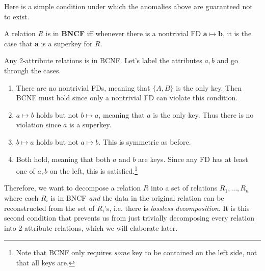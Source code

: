 \documentclass{article}
\begin{document}
    Here is a simple condition under which the anomalies above are guaranteed not to exist. 

    \begin{definition}[BNCF]
      A relation $R$ is in \textbf{BNCF} iff whenever there is a nontrivial FD $\mathbf{a} \mapsto \mathbf{b}$, it is the case that $\mathbf{a}$ is a superkey for $R$. 
    \end{definition}

    \begin{example}
      
    \end{example}

    \begin{example}
      
    \end{example}

    \begin{theorem}
      Any 2-attribute relations is in BCNF. Let's label the attributes $a, b$ and go through the cases. 
      \begin{enumerate}
        \item There are no nontrivial FDs, meaning that $\{A, B\}$ is the only key. Then BCNF must hold since only a nontrivial FD can violate this condition. 
        \item $a \mapsto b$ holds but not $b \mapsto a$, meaning that $a$ is the only key. Thus there is no violation since $a$ is a superkey. 
        \item $b \mapsto a$ holds but not $a \mapsto b$. This is symmetric as before. 
        \item Both hold, meaning that both $a$ and $b$ are keys. Since any FD has at least one of $a, b$ on the left, this is satisfied.\footnote{Note that BCNF only requires \textit{some} key to be contained on the left side, not that all keys are. } 
      \end{enumerate}
    \end{theorem}

    Therefore, we want to decompose a relation $R$ into a set of relations $R_1, \ldots, R_n$ where each $R_i$ is in BNCF \textit{and} the data in the original relation can be reconstructed from the set of $R_i$'s, i.e. there is \textit{lossless decomposition}. It is this second condition that prevents us from just trivially decomposing every relation into 2-attribute relations, which we will elaborate later. 
\end{document}
